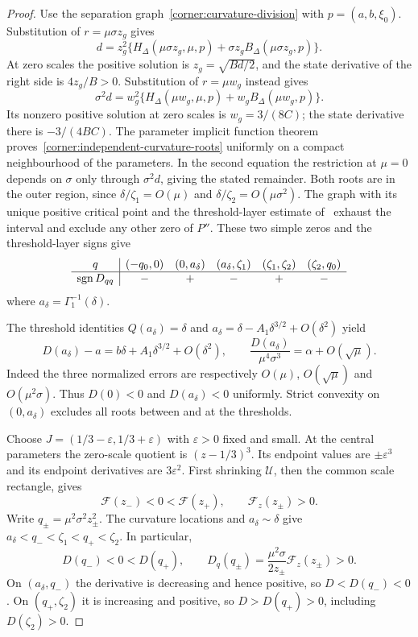 \begin{proof}
Use the separation graph~\eqref{corner:curvature-division} with
$p=(a,b,\xi_0)$. Substitution of $r=\mu\sigma z_g$ gives
\[
 d=z_g^2\{H_\Delta(\mu\sigma z_g,\mu,p)
                   +\sigma z_g B_\Delta(\mu\sigma z_g,p)\}.
\]
At zero scales the positive solution is $z_g=\sqrt{Bd/2}$, and the
state derivative of the right side is $4z_g/B>0$.
Substitution of $r=\mu w_g$ instead gives
\[
 \sigma^2d=w_g^2\{H_\Delta(\mu w_g,\mu,p)+w_gB_\Delta(\mu w_g,p)\}.
\]
Its nonzero positive solution at zero scales is $w_g=3/(8C)$; the
state derivative there is $-3/(4BC)$. The parameter implicit function
theorem proves~\eqref{corner:independent-curvature-roots} uniformly on
a compact neighbourhood of the parameters. In the second equation the restriction
at $\mu=0$ depends on $\sigma$ only through $\sigma^2d$, giving the
stated remainder. Both roots are in the outer region, since
$\delta/\zeta_1=O(\mu)$ and $\delta/\zeta_2=O(\mu\sigma^2)$.
The graph with its unique positive critical point and the threshold-layer
estimate of~\cite[Lemma~\ref*{main-lem:event-layer}]{main2026} exhaust the
interval and exclude any other zero of $P''$. These two simple zeros and the threshold-layer signs give
\[
\begin{array}{c|ccccc}
q&(-q_0,0)&(0,a_\delta)&(a_\delta,\zeta_1)&(\zeta_1,\zeta_2)&(\zeta_2,q_0)\\ \hline
\operatorname{sgn} D_{qq}&-&+&-&+&-
\end{array}
\]
where $a_\delta=\Gamma_1^{-1}(\delta)$.

The threshold identities $Q(a_\delta)=\delta$ and
$a_\delta=\delta-A_1\delta^{3/2}+O(\delta^2)$ yield
\[
 D(a_\delta)-a=b\delta+A_1\delta^{3/2}+O(\delta^2),\qquad
 \frac{D(a_\delta)}{\mu^4\sigma^3}=\alpha+O(\sqrt\mu).
\]
Indeed the three normalized errors are respectively
$O(\mu)$, $O(\sqrt\mu)$ and $O(\mu^2\sigma)$.
Thus $D(0)<0$ and $D(a_\delta)<0$ uniformly. Strict convexity on $(0,a_\delta)$
excludes all roots between and at the thresholds.

Choose $J=(1/3-\varepsilon,1/3+\varepsilon)$ with $\varepsilon>0$
fixed and small. At the central parameters the zero-scale quotient is
$(z-1/3)^3$. Its endpoint values are $\pm\varepsilon^3$ and its
endpoint derivatives are $3\varepsilon^2$. First shrinking
$\mathcal U$, then the common scale rectangle, gives
\begin{equation}\label{corner:cusp-window-signs}
 \mathcal F(z_-)<0<\mathcal F(z_+),\qquad
 \mathcal F_z(z_\pm)>0.
\end{equation}
Write $q_\pm=\mu^2\sigma^2z_\pm^2$. The curvature locations and
$a_\delta\sim\delta$ give $a_\delta<q_-<\zeta_1<q_+<\zeta_2$.
In particular,
\[
 D(q_-)<0<D(q_+),\qquad
 D_q(q_\pm)=\frac{\mu^2\sigma}{2z_\pm}
                       \mathcal F_z(z_\pm)>0.
\]
On $(a_\delta,q_-)$ the derivative is decreasing and hence positive, so
$D<D(q_-)<0$. On $(q_+,\zeta_2)$ it is increasing and positive, so
$D>D(q_+)>0$, including $D(\zeta_2)>0$.


\end{proof}
